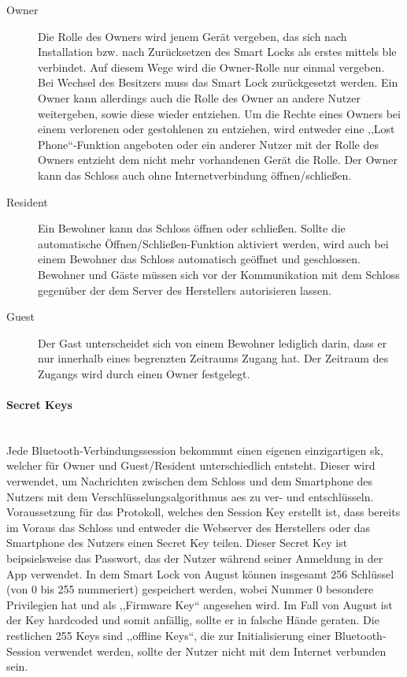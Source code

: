 		\begin{description}
		    \item [Owner] Die Rolle des Owners wird jenem Gerät vergeben, das sich nach Installation bzw. nach Zurücksetzen des Smart Locks als erstes mittels \gls{ble} verbindet. 
   		        Auf diesem Wege wird die Owner-Rolle nur einmal vergeben. 
   		        Bei Wechsel des Besitzers muss das Smart Lock zurückgesetzt werden. 
   		        Ein Owner kann allerdings auch die Rolle des Owner an andere Nutzer weitergeben, sowie diese wieder entziehen. 
   		        Um die Rechte eines Owners bei einem verlorenen oder gestohlenen zu entziehen, wird entweder eine ,,Lost Phone``-Funktion angeboten oder ein anderer Nutzer mit der Rolle des Owners entzieht dem nicht mehr vorhandenen Gerät die Rolle. 
   		        Der Owner kann das Schloss auch ohne Internetverbindung öffnen/schließen. 
   	        \item [Resident] Ein Bewohner kann das Schloss öffnen oder schließen. 
   	            Sollte die automatische Öffnen/Schließen-Funktion aktiviert werden, wird auch bei einem Bewohner das Schloss automatisch geöffnet und geschlossen. 
   	            Bewohner und Gäste müssen sich vor der Kommunikation mit dem Schloss gegenüber der dem Server des Herstellers autorisieren lassen.
   	        \item [Guest] Der Gast unterscheidet sich von einem Bewohner lediglich darin, dass er nur innerhalb eines begrenzten Zeitraums Zugang hat. 
                Der Zeitraum des Zugangs wird durch einen Owner festgelegt.
		\end{description}
        
		\paragraph{Secret Keys}\hspace{0pt}\smallskip\\
		Jede Bluetooth-Verbindungssession bekommmt einen eigenen einzigartigen \gls{sk}, welcher für Owner und Guest/Resident unterschiedlich entsteht.
		Dieser wird verwendet, um Nachrichten zwischen dem Schloss und dem Smartphone des Nutzers mit dem Verschlüsselungsalgorithmus \gls{aes} zu ver- und entschlüsseln. 
		Voraussetzung für das Protokoll, welches den Session Key erstellt ist, dass bereits im Voraus das Schloss und entweder die Webserver des Herstellers oder das Smartphone des Nutzers einen Secret Key teilen. 
		Dieser Secret Key ist beipsielsweise das Passwort, das der Nutzer während seiner Anmeldung in der App verwendet. 
		In dem Smart Lock von August können insgesamt 256 Schlüssel (von 0 bis 255 nummeriert) gespeichert werden, wobei Nummer 0 besondere Privilegien hat und als ,,Firmware Key`` angesehen wird.\cite{Fuller2017} 
		Im Fall von August ist der Key hardcoded und somit anfällig, sollte er in falsche Hände geraten\cite{Rose2016}. 
        Die restlichen 255 Keys sind ,,offline Keys``, die zur Initialisierung einer Bluetooth-Session verwendet werden, sollte der Nutzer nicht mit dem Internet verbunden sein.\cite{Fuller2017}
        
